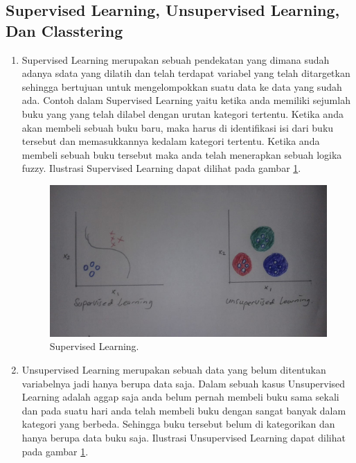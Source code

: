 \subsection{Supervised Learning, Unsupervised Learning, Dan Classtering}
\begin{enumerate}
\item Supervised Learning merupakan sebuah pendekatan yang dimana sudah adanya sdata yang dilatih dan telah terdapat variabel yang telah ditargetkan sehingga bertujuan untuk mengelompokkan suatu data ke data yang sudah ada. Contoh dalam Supervised Learning yaitu ketika anda memiliki sejumlah buku yang yang telah dilabel dengan urutan kategori tertentu. Ketika anda akan membeli sebuah buku baru, maka harus di identifikasi isi dari buku tersebut dan memasukkannya kedalam kategori tertentu. Ketika anda membeli sebuah buku tersebut maka anda telah menerapkan sebuah logika fuzzy. Ilustrasi Supervised Learning dapat dilihat pada gambar \ref{2}.

		\begin{figure}[ht]
		\centerline{\includegraphics[width=1\textwidth]{figures/AIP/2.JPEG}}
		\caption{Supervised Learning.}
		\label{2}
		\end{figure}

\item Unsupervised Learning merupakan sebuah data yang belum ditentukan variabelnya jadi hanya berupa data saja. Dalam sebuah kasus Unsupervised Learning adalah aggap saja anda belum pernah membeli buku sama sekali dan pada suatu hari anda telah membeli buku dengan sangat banyak dalam kategori yang berbeda. Sehingga buku tersebut belum di kategorikan dan hanya berupa data buku saja. Ilustrasi Unsupervised Learning dapat dilihat pada gambar \ref{2}.


\end{enumerate}
